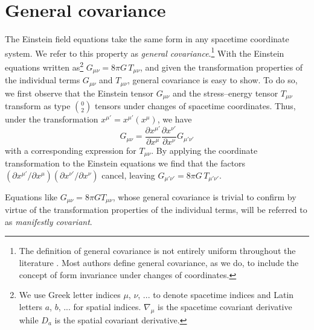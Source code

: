 \documentclass[letterpaper,nofootinbib,prd,amsmath,onecolumn]{revtex4-1}
\begin{document}

\section{General covariance}\label{covariance}
The Einstein field equations take the same 
form in any spacetime coordinate system. We refer to this property as {\em general covariance}.\footnote{The definition of 
general covariance is not entirely uniform throughout the literature \cite{Weinberg:GRbook,Misner:1974qy,Wald:GRbook,Lambourne:GRbook}. Most authors 
define general covariance, as we do, to include the concept of form invariance under changes of coordinates.} 
With the Einstein equations written as\footnote{We use Greek letter indices $\mu$, $\nu$, ... to denote spacetime indices and Latin 
letters $a$, $b$, ... for spatial indices. $\nabla_{\mu}$ is the spacetime covariant derivative while $D_{a}$ is the spatial 
covariant derivative.} $G_{\mu\nu} = 8\pi G\, T_{\mu\nu}$, and given the transformation properties 
of the individual terms $G_{\mu\nu}$ and $T_{\mu\nu}$, general covariance is easy to show. To do so, we first observe that 
the Einstein tensor $G_{\mu\nu}$ and the stress--energy tensor $T_{\mu\nu}$ transform as type $0\choose 2$ tensors under changes 
of spacetime coordinates. Thus, under the  
transformation $x^{\mu'} = x^{\mu'}(x^\mu)$, we have
\begin{equation}
	G_{\mu\nu} = \frac{\partial x^{\mu'}}{\partial x^{\mu}} \frac{\partial x^{\nu'}}{\partial x^{\nu}} G_{\mu'\nu'} 
\end{equation}
with a corresponding expression for $T_{\mu\nu}$. By applying the coordinate transformation 
to the Einstein equations we find that the factors 
$(\partial x^{\mu'}/\partial x^{\mu}) (\partial x^{\nu'}/\partial x^{\nu})$
cancel, leaving $G_{\mu'\nu'} = 8\pi G\, T_{\mu'\nu'}$. 

Equations like $G_{\mu\nu} = 8\pi G T_{\mu\nu}$, whose general covariance is trivial to confirm by virtue 
of the transformation properties of the individual terms, will be referred to as {\em manifestly covariant}. 
\end{document}
